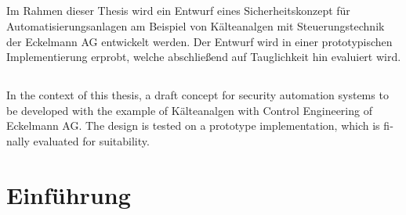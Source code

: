 \documentclass[11pt,a4paper]{report}
\begin{document}

\vfill
\section*{\center\abstractname{}}

Im Rahmen dieser Thesis wird ein Entwurf eines Sicherheitskonzept für Automatisierungsanlagen am Beispiel von Kälteanalgen mit Steuerungstechnik der Eckelmann AG entwickelt werden. Der Entwurf wird in einer prototypischen Implementierung erprobt, welche abschließend auf Tauglichkeit hin evaluiert wird.

\vfill

\begin{otherlanguage}{english} 
\section*{\center\abstractname{}}

In the context of this thesis, a draft concept for security automation systems to be developed with the example of Kälteanalgen with Control Engineering of Eckelmann AG. The design is tested on a prototype implementation, which is finally evaluated for suitability.

\end{otherlanguage}
\vfill

\tableofcontents
\clearpage 


\chapter{Einführung} \label{chap:intro}
\end{document}
